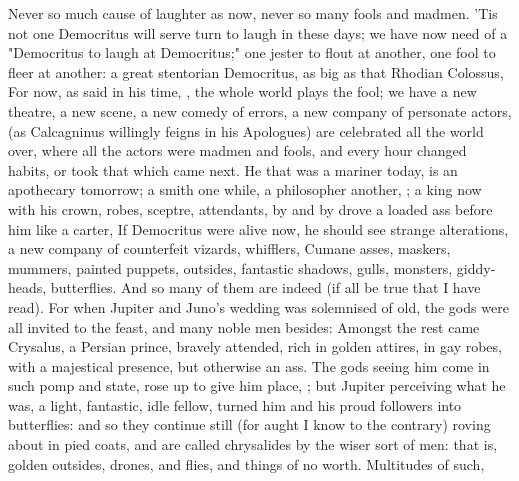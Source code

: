 Never so much cause of laughter as now, never so many fools and madmen. 'Tis
not one Democritus will serve turn to laugh in these days;
we have now need of a "Democritus to laugh at Democritus;" one jester to flout
at another, one fool to fleer at another: a great stentorian Democritus, as big
as that Rhodian Colossus, For now, as
 said in his time, , the whole world plays the fool; we have a new theatre, a new
scene, a new comedy of errors, a new company of personate actors,  (as Calcagninus willingly feigns in his Apologues) are celebrated all
the world over, where all the actors were madmen and fools,
and every hour changed habits, or took that which came next. He that was a
mariner today, is an apothecary tomorrow; a smith one while, a philosopher
another, ; a king now with his crown, robes, sceptre,
attendants, by and by drove a loaded ass before him like a carter, \etc{} If
Democritus were alive now, he should see strange alterations, a new company of
counterfeit vizards, whifflers, Cumane asses, maskers, mummers, painted
puppets, outsides, fantastic shadows, gulls, monsters, giddy-heads,
butterflies. And so many of them are indeed (if all be true
that I have read). For when Jupiter and Juno's wedding was solemnised of old,
the gods were all invited to the feast, and many noble men besides: Amongst the
rest came Crysalus, a Persian prince, bravely attended, rich in golden attires,
in gay robes, with a majestical presence, but otherwise an ass. The gods seeing
him come in such pomp and state, rose up to give him place, ; but Jupiter perceiving what he was, a
light, fantastic, idle fellow, turned him and his proud followers into
butterflies: and so they continue still (for aught I know to the contrary)
roving about in pied coats, and are called chrysalides by the wiser sort of
men: that is, golden outsides, drones, and flies, and things of no worth.
Multitudes of such, \etc{}


